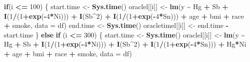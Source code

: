\documentclass[12pt, twoside]{amherstthesis}
\newenvironment{Shaded}{\begin{snugshade}}{\end{snugshade}}
\newcommand{\AttributeTok}[1]{\textcolor[rgb]{0.13,0.29,0.53}{#1}}
\newcommand{\ControlFlowTok}[1]{\textcolor[rgb]{0.13,0.29,0.53}{\textbf{#1}}}
\newcommand{\DecValTok}[1]{\textcolor[rgb]{0.00,0.00,0.81}{#1}}
\newcommand{\FunctionTok}[1]{\textcolor[rgb]{0.13,0.29,0.53}{\textbf{#1}}}
\newcommand{\NormalTok}[1]{#1}
\newcommand{\OtherTok}[1]{\textcolor[rgb]{0.56,0.35,0.01}{#1}}
\newcommand{\SpecialCharTok}[1]{\textcolor[rgb]{0.81,0.36,0.00}{\textbf{#1}}}
\begin{document}
\begin{Shaded}
\begin{Highlighting}[]
    \ControlFlowTok{if}\NormalTok{(i }\SpecialCharTok{\textless{}=} \DecValTok{100}\NormalTok{) \{}
\NormalTok{      start.time }\OtherTok{\textless{}{-}} \FunctionTok{Sys.time}\NormalTok{()}
\NormalTok{      oraclel[[i]] }\OtherTok{\textless{}{-}} \FunctionTok{lm}\NormalTok{(y }\SpecialCharTok{\textasciitilde{}}\NormalTok{ Hg }\SpecialCharTok{+}\NormalTok{ Sb }\SpecialCharTok{+}
                           \FunctionTok{I}\NormalTok{(}\DecValTok{1}\SpecialCharTok{/}\NormalTok{(}\DecValTok{1}\SpecialCharTok{+}\FunctionTok{exp}\NormalTok{(}\SpecialCharTok{{-}}\DecValTok{4}\SpecialCharTok{*}\NormalTok{Ni))) }\SpecialCharTok{+} \FunctionTok{I}\NormalTok{(Sb}\SpecialCharTok{\^{}}\DecValTok{2}\NormalTok{) }\SpecialCharTok{+} \FunctionTok{I}\NormalTok{(}\DecValTok{1}\SpecialCharTok{/}\NormalTok{(}\DecValTok{1}\SpecialCharTok{+}\FunctionTok{exp}\NormalTok{(}\SpecialCharTok{{-}}\DecValTok{4}\SpecialCharTok{*}\NormalTok{Sn))) }\SpecialCharTok{+}
\NormalTok{                           age }\SpecialCharTok{+}\NormalTok{ bmi }\SpecialCharTok{+}\NormalTok{ race }\SpecialCharTok{+}\NormalTok{ smoke, }\AttributeTok{data =}\NormalTok{ df)}
\NormalTok{      end.time }\OtherTok{\textless{}{-}} \FunctionTok{Sys.time}\NormalTok{()}
\NormalTok{      oracletimel[[i]] }\OtherTok{\textless{}{-}}\NormalTok{ end.time }\SpecialCharTok{{-}}\NormalTok{ start.time}
\NormalTok{    \} }\ControlFlowTok{else} \ControlFlowTok{if}\NormalTok{ (i }\SpecialCharTok{\textless{}=} \DecValTok{300}\NormalTok{) \{}
\NormalTok{      start.time }\OtherTok{\textless{}{-}} \FunctionTok{Sys.time}\NormalTok{()}
\NormalTok{      oraclel[[i]] }\OtherTok{\textless{}{-}} \FunctionTok{lm}\NormalTok{(y }\SpecialCharTok{\textasciitilde{}}\NormalTok{ Hg }\SpecialCharTok{+}\NormalTok{ Sb }\SpecialCharTok{+}
                           \FunctionTok{I}\NormalTok{(}\DecValTok{1}\SpecialCharTok{/}\NormalTok{(}\DecValTok{1}\SpecialCharTok{+}\FunctionTok{exp}\NormalTok{(}\SpecialCharTok{{-}}\DecValTok{4}\SpecialCharTok{*}\NormalTok{Ni))) }\SpecialCharTok{+} \FunctionTok{I}\NormalTok{(Sb}\SpecialCharTok{\^{}}\DecValTok{2}\NormalTok{) }\SpecialCharTok{+} \FunctionTok{I}\NormalTok{(}\DecValTok{1}\SpecialCharTok{/}\NormalTok{(}\DecValTok{1}\SpecialCharTok{+}\FunctionTok{exp}\NormalTok{(}\SpecialCharTok{{-}}\DecValTok{4}\SpecialCharTok{*}\NormalTok{Sn))) }\SpecialCharTok{+}
\NormalTok{                           Hg}\SpecialCharTok{*}\NormalTok{Ni }\SpecialCharTok{+} 
\NormalTok{                           age }\SpecialCharTok{+}\NormalTok{ bmi }\SpecialCharTok{+}\NormalTok{ race }\SpecialCharTok{+}\NormalTok{ smoke, }\AttributeTok{data =}\NormalTok{ df)}

\end{Highlighting}
\end{Shaded}
\end{document}
